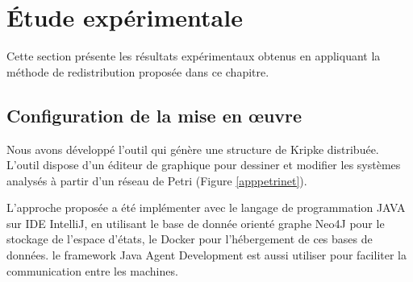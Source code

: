 \section{Étude expérimentale}
Cette section présente les résultats expérimentaux obtenus en appliquant la méthode de redistribution proposée dans ce chapitre.

\subsection{Configuration de la mise en œuvre}
Nous avons développé l’outil qui génère une structure de Kripke distribuée. L’outil dispose d’un éditeur de graphique pour dessiner et modifier les systèmes analysés à partir d'un réseau de Petri (Figure \ref{apppetrinet}).

L’approche proposée a été implémenter avec le langage de programmation JAVA sur IDE IntelliJ, en utilisant le base de donnée orienté graphe Neo4J pour le stockage de l'espace d'états, le Docker pour l'hébergement de ces bases de données. le framework Java Agent Development est aussi utiliser pour faciliter la communication entre les machines.
